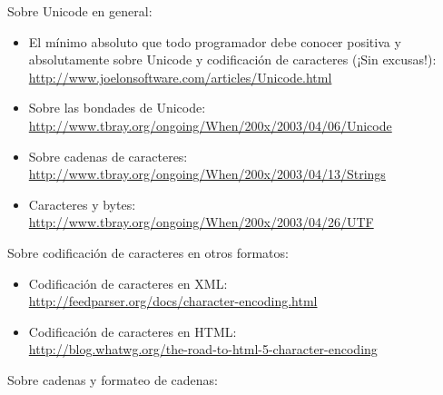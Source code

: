 Sobre Unicode en general:

\begin{itemize}

\item El mínimo absoluto que todo programador debe conocer positiva y absolutamente sobre Unicode y codificación de caracteres (¡Sin excusas!):\\
\href{http://www.joelonsoftware.com/articles/Unicode.html}{http://www.joelonsoftware.com/articles/Unicode.html}

\item Sobre las bondades de Unicode:\\
\href{http://www.tbray.org/ongoing/When/200x/2003/04/06/Unicode}{http://www.tbray.org/ongoing/When/200x/2003/04/06/Unicode}

\item Sobre cadenas de caracteres:\\
\href{http://www.tbray.org/ongoing/When/200x/2003/04/13/Strings}{http://www.tbray.org/ongoing/When/200x/2003/04/13/Strings}

\item Caracteres y bytes:\\
\href{http://www.tbray.org/ongoing/When/200x/2003/04/26/UTF}{http://www.tbray.org/ongoing/When/200x/2003/04/26/UTF}

\end{itemize}

Sobre codificación de caracteres en otros formatos:

\begin{itemize}

\item Codificación de caracteres en XML:\\
\href{http://feedparser.org/docs/character-encoding.html}{http://feedparser.org/docs/character-encoding.html}

\item Codificación de caracteres en HTML:\\
\href{http://blog.whatwg.org/the-road-to-html-5-character-encoding}{http://blog.whatwg.org/the-road-to-html-5-character-encoding}

\end{itemize}

Sobre cadenas y formateo de cadenas:

